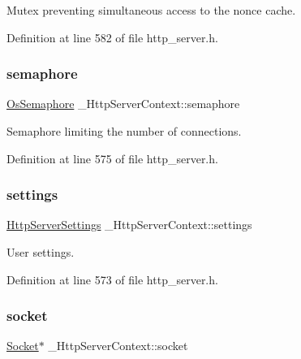 Mutex preventing simultaneous access to the nonce cache. 



Definition at line 582 of file http\+\_\+server.\+h.

\mbox{\label{struct__HttpServerContext_abef2a2cc2c82418529cf4831e5f35fd2}} 
\subsubsection{\texorpdfstring{semaphore}{semaphore}}
{\footnotesize\ttfamily \hyperlink{structOsSemaphore}{Os\+Semaphore} \+\_\+\+Http\+Server\+Context\+::semaphore}



Semaphore limiting the number of connections. 



Definition at line 575 of file http\+\_\+server.\+h.

\mbox{\label{struct__HttpServerContext_aff8572faace47a155e9e6d8564abb006}} 
\subsubsection{\texorpdfstring{settings}{settings}}
{\footnotesize\ttfamily \hyperlink{structHttpServerSettings}{Http\+Server\+Settings} \+\_\+\+Http\+Server\+Context\+::settings}



User settings. 



Definition at line 573 of file http\+\_\+server.\+h.

\mbox{\label{struct__HttpServerContext_ad4a6bcdee7a266376683291a8e15bd8d}} 
\subsubsection{\texorpdfstring{socket}{socket}}
{\footnotesize\ttfamily \hyperlink{socket_8h_aa85acfb0fa336ef495e6ba87fb88fc48}{Socket}$\ast$ \+\_\+\+Http\+Server\+Context\+::socket}



